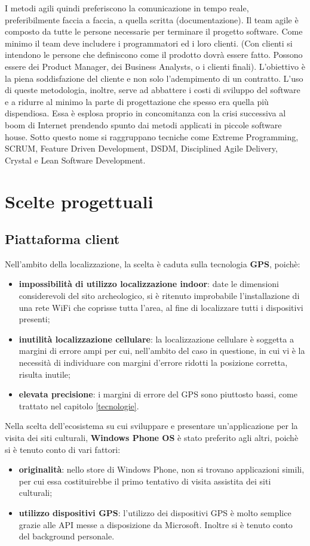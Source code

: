 I metodi agili quindi preferiscono la comunicazione in tempo reale, preferibilmente faccia a faccia, a quella scritta (documentazione). Il team agile è composto da tutte le persone necessarie per terminare il progetto software. Come minimo il team deve includere i programmatori ed i loro clienti. (Con clienti si intendono le persone che definiscono come il prodotto dovrà essere fatto. Possono essere dei Product Manager, dei Business Analysts, o i clienti finali). L'obiettivo è la piena soddisfazione del cliente e non solo l'adempimento di un contratto. 
L'uso di queste metodologia, inoltre, serve ad abbattere i costi di sviluppo del software e a ridurre al minimo la parte di progettazione che spesso era quella più dispendiosa. Essa è esplosa proprio in concomitanza con la crisi successiva al boom di Internet prendendo spunto dai metodi applicati in piccole software house. Sotto questo nome si raggruppano tecniche come Extreme Programming, SCRUM, Feature Driven Development, DSDM, Disciplined Agile Delivery, Crystal e Lean Software Development.

\section{Scelte progettuali}
\subsection{Piattaforma client}
Nell'ambito della localizzazione, la scelta è caduta sulla tecnologia \textbf{GPS}, poichè:
\begin{itemize}
\item \textbf{impossibilità di utilizzo localizzazione indoor}: date le dimensioni considerevoli del sito archeologico, si è ritenuto improbabile l'installazione di una rete WiFi che coprisse tutta l'area, al fine di localizzare tutti i dispositivi presenti;
\item \textbf{inutilità localizzazione cellulare}: la localizzazione cellulare è soggetta a margini di errore ampi per cui, nell'ambito del caso in questione, in cui vi è la necessità di individuare con margini d'errore ridotti la posizione corretta, risulta inutile;
\item \textbf{elevata precisione}: i margini di errore del GPS sono piuttosto bassi, come trattato nel capitolo \ref{tecnologie}.
\end{itemize}


Nella scelta dell'ecosistema su cui sviluppare e presentare un'applicazione per la visita dei siti culturali, \textbf{Windows Phone OS} è stato preferito agli altri, poichè si è tenuto conto di vari fattori:
\begin{itemize}
\item \textbf{originalità}: nello store di Windows Phone, non si trovano applicazioni simili, per cui essa costituirebbe il primo tentativo di visita assistita dei siti culturali;
\item \textbf{utilizzo dispositivi GPS}: l'utilizzo dei dispositivi GPS è molto semplice grazie alle API messe a disposizione da Microsoft. Inoltre si è tenuto conto del background personale.
\end{itemize}

